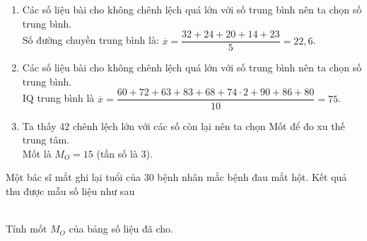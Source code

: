 \begin{bt}
{\begin{enumerate}
			Ta không chọn số trung bình vì số trung bình là $17{,}5$ chênh lệch với $63$ lớn. Mốt cũng thế.
			\item Các số liệu bài cho không chênh lệch quá lớn với số trung bình nên ta chọn số trung bình.\\
			Số đường chuyền trung bình là: $\overline{x}=\dfrac{32+24+20+14+23}{5}=22{,}6$.
			\item Các số liệu bài cho không chênh lệch quá lớn với số trung bình nên ta chọn số trung bình.\\
			IQ trung bình là $\overline{x}=\dfrac{60+72+63+83+68+74\cdot 2+90+86+80}{10}=75$.
			\item Ta thấy $42$ chênh lệch lớn với các số còn lại nên ta chọn Mốt để đo xu thế trung tâm.\\
			Mốt là $M_O=15$ (tần số là $3$).
		\end{enumerate}
	}
\end{bt}

\begin{bt}%
	Một bác sĩ mắt ghi lại tuổi của $30$ bệnh nhân mắc bệnh đau mắt hột. Kết quả thu được mẫu số liệu như sau\\
	\\
	
	Tính mốt $M_O$ của bảng số liệu đã cho. 
\end{bt}

